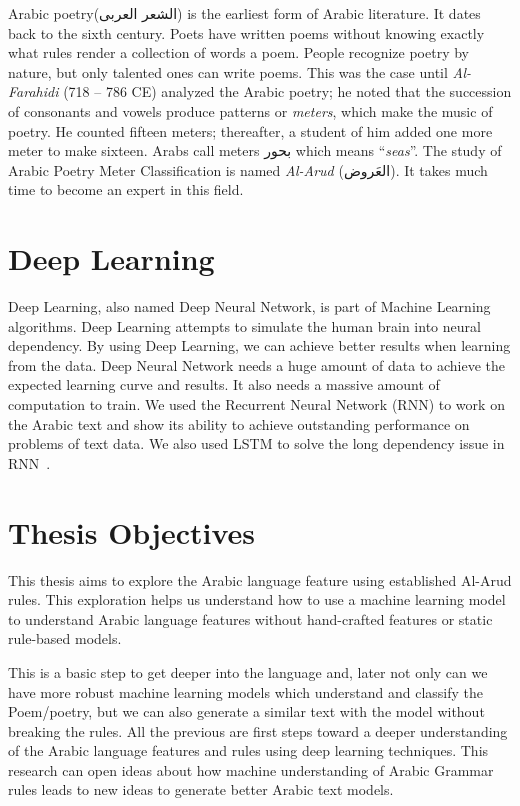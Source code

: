 Arabic poetry(\textarabic{الشعر العربى}) is the earliest form of Arabic literature. It dates back to the sixth century. Poets have written poems without knowing exactly what rules render a collection of words a poem. People recognize poetry by nature, but only talented ones can write poems. This was the case until \textit{Al-Farahidi} (718 – 786 CE) analyzed the Arabic poetry; he noted that the succession of consonants and vowels produce patterns or \textit{meters}, which make the music of poetry. He counted fifteen meters; thereafter, a student of him added one more meter to make sixteen. Arabs call meters \textarabic{بحور} which means ``\textit{seas}''. The study of Arabic Poetry Meter Classification is named \textit{Al-Arud} (\textarabic{العَروض}). It takes much time to become an expert in this field. 
\section{Deep Learning}

Deep Learning, also named Deep Neural Network, is part of Machine Learning algorithms. Deep Learning attempts to simulate the human brain into neural dependency.  By using Deep Learning, we can achieve better results when learning from the data. Deep Neural Network needs a huge amount of data to achieve the expected learning curve and results. It also needs a massive amount of computation to train. We used the Recurrent Neural Network (RNN) to work on the Arabic text and show its ability to achieve outstanding performance on problems of text data. We also used LSTM to solve the long dependency issue in RNN~.

\section{Thesis Objectives}
This thesis aims to explore the Arabic language feature using established Al-Arud rules. This exploration helps us understand how to use a machine learning model to understand Arabic language features without hand-crafted features or static rule-based models.

This is a basic step to get deeper into the language and, later not only can we have more robust machine learning models which understand and classify the Poem/poetry, but we can also generate a similar text with the model without breaking the rules. All the previous are first steps toward a deeper understanding of the Arabic language features and rules using deep learning techniques. This research can open ideas about how machine understanding of Arabic Grammar rules leads to new ideas to generate better Arabic text models.

